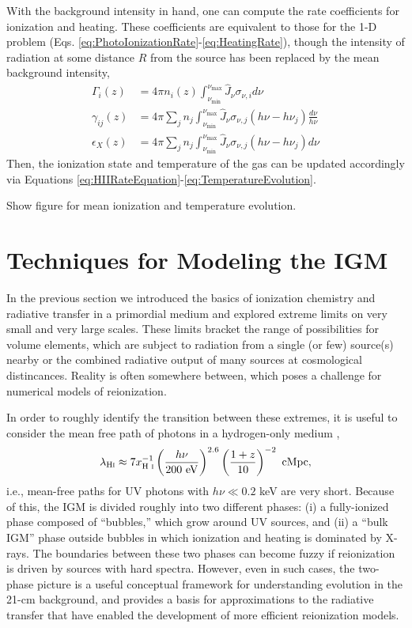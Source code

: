 With the background intensity in hand, one can compute the rate coefficients for ionization and heating. These coefficients are equivalent to those for the 1-D problem (Eqs. \ref{eq:PhotoIonizationRate}-\ref{eq:HeatingRate}), though the intensity of radiation at some distance $R$ from the source has been replaced by the mean background intensity,
\begin{align}
    \Gamma_{i}(z) & = 4 \pi n_i(z) \int_{\nu_{\min}}^{\nu_{\max}} \hat{J}_{\nu} \sigma_{\nu,i} d\nu  \\
    \gamma_{ij}(z) & = 4 \pi \sum_j n_j \int_{\nu_{\min}}^{\nu_{\max}}  \hat{J}_{\nu} \sigma_{\nu,j} (h\nu - h\nu_j) \frac{d\nu}{h\nu}  \\
    \epsilon_X(z) & = 4 \pi \sum_j n_j \int_{\nu_{\min}}^{\nu_{\max}}  \hat{J}_{\nu}  \sigma_{\nu,j} (h\nu - h\nu_j) d\nu
\end{align}
Then, the ionization state and temperature of the gas can be updated accordingly via Equations \ref{eq:HIIRateEquation}-\ref{eq:TemperatureEvolution}.

{\color{red} Show figure for mean ionization and temperature evolution.}

\section{Techniques for Modeling the IGM} \label{sec:techniques}
In the previous section we introduced the basics of ionization chemistry and radiative transfer in a primordial medium and explored extreme limits on very small and very large scales. These limits bracket the range of possibilities for volume elements, which are subject to radiation from a single (or few) source(s) nearby or the combined radiative output of many sources at cosmological distincances. Reality is often somewhere between, which poses a challenge for numerical models of reionization.  

In order to roughly identify the transition between these extremes, it is useful to consider the mean free path of photons in a hydrogen-only medium \cite{McQuinn2012},
\begin{equation}
	\lambda_{\text{H} {\textsc{i}}} \approx 7 x_{\text{H } \textsc{i}}^{-1} \left(\frac{h\nu}{200 \ \mathrm{eV}} \right)^{2.6} \left(\frac{1+z}{10} \right)^{-2} \ \mathrm{cMpc} \label{eq:mfp},
\end{equation}
i.e., mean-free paths for UV photons with $h\nu \ll 0.2$ keV are very short. Because of this, the IGM is divided roughly into two different phases: (i) a fully-ionized phase composed of ``bubbles,'' which grow around UV sources, and (ii) a ``bulk IGM'' phase outside bubbles in which ionization and heating is dominated by X-rays. The boundaries between these two phases can become fuzzy if reionization is driven by sources with hard spectra. However, even in such cases, the two-phase picture is a useful conceptual framework for understanding evolution in the 21-cm background, and provides a basis for approximations to the radiative transfer that have enabled the development of more efficient reionization models.

